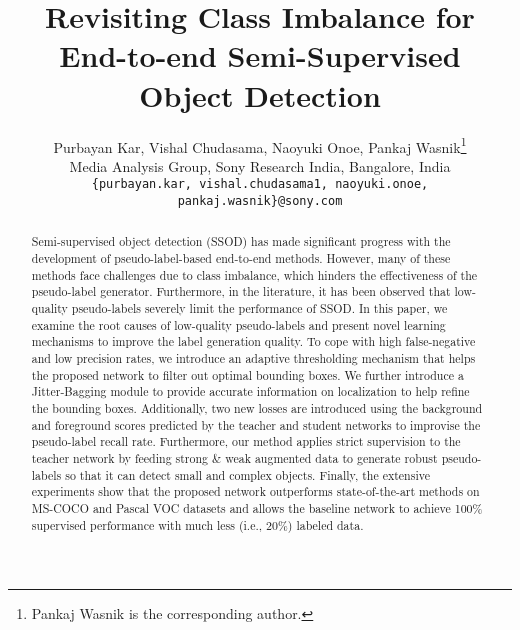 \documentclass[10pt,twocolumn,letterpaper]{article}
\begin{document}
\title{Revisiting Class Imbalance for End-to-end Semi-Supervised Object Detection}

\author{Purbayan Kar, Vishal Chudasama, Naoyuki Onoe, Pankaj Wasnik\thanks{Pankaj Wasnik is the corresponding author.} \\ Media Analysis Group, Sony Research India, Bangalore, India\\
\tt\normalsize\{purbayan.kar, vishal.chudasama1, naoyuki.onoe, pankaj.wasnik\}@sony.com}

\maketitle

\begin{abstract}
Semi-supervised object detection (SSOD) has made significant progress with the development of pseudo-label-based end-to-end methods. However, many of these methods face challenges due to class imbalance, which hinders the effectiveness of the pseudo-label generator. Furthermore, in the literature, it has been observed that low-quality pseudo-labels severely limit the performance of SSOD. 
In this paper, we examine the root causes of low-quality pseudo-labels and present novel learning mechanisms to improve the label generation quality. To cope with high false-negative and low precision rates, we introduce an adaptive thresholding mechanism that helps the proposed network to filter out optimal bounding boxes. We further introduce a Jitter-Bagging module to provide accurate information on localization to help refine the bounding boxes. Additionally, two new losses are introduced using the background and foreground scores predicted by the teacher and student networks to improvise the pseudo-label recall rate. Furthermore, our method applies strict supervision to the teacher network by feeding strong \& weak augmented data to generate robust pseudo-labels so that it can detect small and complex objects. Finally, the extensive experiments show that the proposed network outperforms state-of-the-art methods on MS-COCO and Pascal VOC datasets and allows the baseline network to achieve 100\% supervised performance with much less (i.e., 20\%) labeled data.
\end{abstract}
\end{document}
